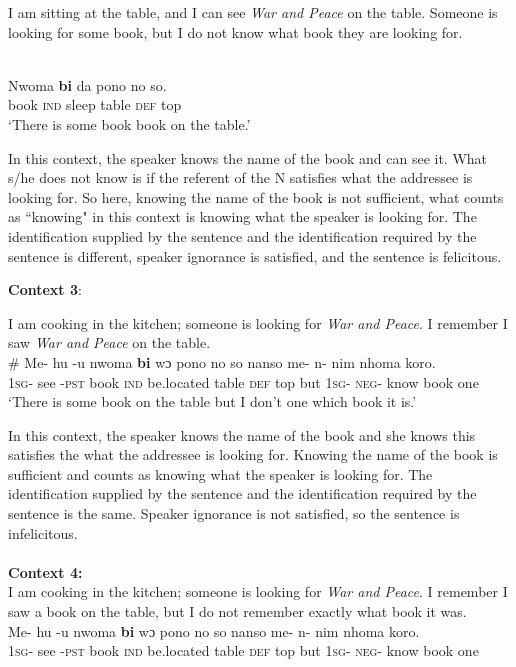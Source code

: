 \documentclass[output=paper,modfonts,nonflat,draftmode]{langsci/langscibook}
\begin{document}
I am sitting at the table, and I can see \emph{\emph{War and Peace}} on the table. Someone is looking for some book, but I do not know what book they are looking for.  

\ea\label{owusu:ex62}\\
\gll Nwoma \textbf{bi} da pono no so.\\
	      book \textsc{ind}  sleep table \textsc{def} top\\

\glt `There is some book book on the table.'

 \z In this context, the speaker knows the name of the book and can see it. What s/he does not know is if the referent of the N satisfies what the addressee is looking for. So here, knowing the name of the book is not sufficient, what counts as ``knowing" in this context is knowing what the speaker is looking for.  The identification supplied by the sentence and the identification required by the sentence is different, speaker ignorance is satisfied, and the sentence is felicitous.
 
\textbf{Context 3}:

I am cooking in the kitchen; someone is looking for \emph{War and Peace}. I remember I saw \emph{War and Peace} on the table.
\ea\label{owusu:ex62a}\\
\gll \# Me- hu -u nwoma \textbf{bi} wɔ pono no so nanso me- n- nim nhoma koro.\\
	     {} \textsc{1sg}- see -\textsc{pst}  book \textsc{ind}  be.located table \textsc{def}  top but \textsc{1sg}- \textsc{neg}- know book one\\

\glt `There is some book on the table but I don't one which book it is.'

 \z In this context, the speaker knows the name of the book and she knows this satisfies the what the addressee is looking for. Knowing the name of the book is sufficient and counts as knowing what the speaker is looking for. The identification supplied by the sentence and the identification required by the sentence is the same. Speaker ignorance is not satisfied, so the sentence is infelicitous.  \\\\
\textbf{Context 4:} \\
I am cooking in the kitchen; someone is looking for \emph{War and Peace}. I remember I saw a book on the table, but I do not remember exactly what book it was.
\ea\label{owusu:ex62b}\\
\gll Me- hu -u nwoma \textbf{bi} wɔ pono no so nanso me- n- nim nhoma koro.\\
	     \textsc{1sg}- see -\textsc{pst}  book \textsc{ind}  be.located table \textsc{def} top but \textsc{1sg}- \textsc{neg}- know book one\\
\end{document}
